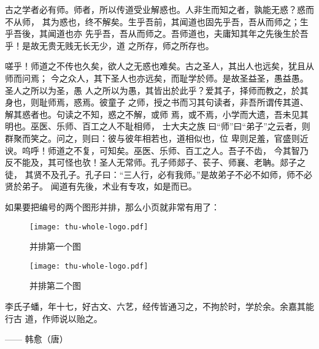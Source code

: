 古之学者必有师。师者，所以传道受业解惑也。人非生而知之者，孰能无惑？惑而不从师，
其为惑也，终不解矣。生乎吾前，其闻道也固先乎吾，吾从而师之；生乎吾後，其闻道也亦
先乎吾，吾从而师之。吾师道也，夫庸知其年之先後生於吾乎！是故无贵无贱无长无少，道
之所存，师之所存也。

嗟乎！师道之不传也久矣，欲人之无惑也难矣。古之圣人，其出人也远矣，犹且从师而问焉；
今之众人，其下圣人也亦远矣，而耻学於师。是故圣益圣，愚益愚。圣人之所以为圣，愚
人之所以为愚，其皆出於此乎？爱其子，择师而教之，於其身也，则耻师焉，惑焉。彼童子
之师，授之书而习其句读者，非吾所谓传其道、解其惑者也。句读之不知，惑之不解，或师
焉，或不焉，小学而大遗，吾未见其明也。巫医、乐师、百工之人不耻相师，  士大夫之族
曰“师”曰“弟子”之云者，则群聚而笑之。问之，则曰：彼与彼年相若也，道相似也，位
卑则足羞，官盛则近谀。呜呼！师道之不复，可知矣。巫医、乐师、百工之人。吾子不齿，
今其智乃反不能及，其可怪也欤！圣人无常师。孔子师郯子、苌子、师襄、老聃。郯子之徒，
其贤不及孔子。孔子曰：“三人行，必有我师。”是故弟子不必不如师，师不必贤於弟子。
闻道有先後，术业有专攻，如是而已。

如果要把编号的两个图形并排，那么小页就非常有用了：
\begin{figure}
\begin{minipage}{0.48\textwidth}
  \centering
  \texttt{[image: thu-whole-logo.pdf]}
  \caption{并排第一个图}
  \label{fig:parallel1}
\end{minipage}\hfill
\begin{minipage}{0.48\textwidth}
  \centering
  \texttt{[image: thu-whole-logo.pdf]}
  \caption{并排第二个图}
  \label{fig:parallel2}
\end{minipage}
\end{figure}

李氏子蟠，年十七，好古文、六艺，经传皆通习之，不拘於时，学於余。余嘉其能行古
道，作师说以贻之。

\hfill —— 韩愈（唐）
